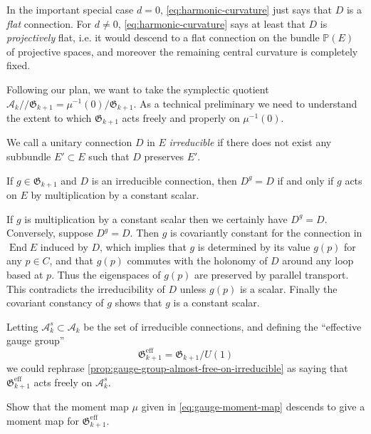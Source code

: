 \documentclass[12pt,letterpaper,reqno]{article}
\numberwithin{equation}{section}
\newcommand{\fG}{{\mathfrak G}}
\newcommand{\cA}{\ensuremath{\mathcal A}}
\newcommand{\PP}{\ensuremath{\mathbb P}}
\newcommand{\kq}{/\!\!/}
\newcommand{\eff}{\mathrm{eff}}
\newcommand{\ti}[1]{\textit{#1}}
\DeclareMathOperator{\End}{End}
\begin{document}
In the important special case $d=0$, \eqref{eq:harmonic-curvature}
just says that $D$ is a \ti{flat} connection.
For $d \neq 0$, \eqref{eq:harmonic-curvature} says at least that $D$ is
\ti{projectively} flat, i.e. it would descend to a flat connection
on the bundle $\PP(E)$ of projective spaces, and moreover the remaining
central curvature is completely fixed.

Following our plan,
we want to take the symplectic quotient $\cA_k \kq \fG_{k+1} = \mu^{-1}(0) / \fG_{k+1}$.
As a technical preliminary we need to understand the extent to
which $\fG_{k+1}$ acts freely and properly on $\mu^{-1}(0)$.

\begin{defn}
We call a unitary connection $D$ in $E$ \ti{irreducible} if there does not
exist any subbundle $E' \subset E$ such that $D$ preserves $E'$.
\end{defn}

\begin{prop} \label{prop:gauge-group-almost-free-on-irreducible}
If $g \in \fG_{k+1}$ and $D$ is an irreducible connection, then $D^g = D$
if and only if $g$ acts on $E$ by multiplication by a constant scalar.
\end{prop}
\begin{pf} If $g$ is multiplication by a constant scalar then we certainly
have $D^g = D$. Conversely,
suppose $D^g = D$. Then $g$ is covariantly constant for the connection in
$\End E$ induced by $D$, which implies that $g$ is determined by
its value $g(p)$ for any $p \in C$, and that $g(p)$ 
commutes with the holonomy of $D$ around any loop based at $p$.
Thus the eigenspaces of $g(p)$ are preserved by parallel
transport. This contradicts the irreducibility of $D$ unless
$g(p)$ is a scalar. Finally the covariant constancy of $g$
shows that $g$ is a constant scalar.
\end{pf}

Letting $\cA^s_{k} \subset \cA_k$ be the set of irreducible connections,
and defining the ``effective gauge group''
\begin{equation}
 \fG^\eff_{k+1} = \fG_{k+1} / U(1)
\end{equation}
we could rephrase \autoref{prop:gauge-group-almost-free-on-irreducible}
as saying that $\fG^\eff_{k+1}$ acts freely on $\cA^s_k$.

\begin{exercise} Show that the moment map $\mu$ given in
\eqref{eq:gauge-moment-map} descends to give a
moment map for $\fG^\eff_{k+1}$.
\end{exercise}
\end{document}
